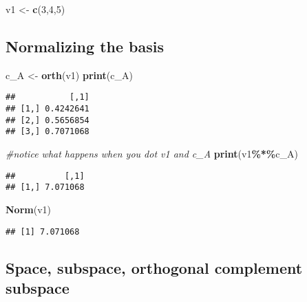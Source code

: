 \documentclass[
]{article}
\newenvironment{Shaded}{\begin{snugshade}}{\end{snugshade}}
\newcommand{\CommentTok}[1]{\textcolor[rgb]{0.56,0.35,0.01}{\textit{#1}}}
\newcommand{\DecValTok}[1]{\textcolor[rgb]{0.00,0.00,0.81}{#1}}
\newcommand{\FunctionTok}[1]{\textcolor[rgb]{0.13,0.29,0.53}{\textbf{#1}}}
\newcommand{\NormalTok}[1]{#1}
\newcommand{\OtherTok}[1]{\textcolor[rgb]{0.56,0.35,0.01}{#1}}
\newcommand{\SpecialCharTok}[1]{\textcolor[rgb]{0.81,0.36,0.00}{\textbf{#1}}}
\begin{document}
\begin{Shaded}
\begin{Highlighting}[]
\NormalTok{v1 }\OtherTok{\textless{}{-}} \FunctionTok{c}\NormalTok{(}\DecValTok{3}\NormalTok{,}\DecValTok{4}\NormalTok{,}\DecValTok{5}\NormalTok{)}
\end{Highlighting}
\end{Shaded}

\hypertarget{normalizing-the-basis}{%
\subsection{Normalizing the basis}\label{normalizing-the-basis}}

\begin{Shaded}
\begin{Highlighting}[]
\NormalTok{c\_A }\OtherTok{\textless{}{-}} \FunctionTok{orth}\NormalTok{(v1)}
\FunctionTok{print}\NormalTok{(c\_A)}
\end{Highlighting}
\end{Shaded}

\begin{verbatim}
##           [,1]
## [1,] 0.4242641
## [2,] 0.5656854
## [3,] 0.7071068
\end{verbatim}

\begin{Shaded}
\begin{Highlighting}[]
\CommentTok{\#notice what happens when you dot v1 and c\_A}
\FunctionTok{print}\NormalTok{(v1}\SpecialCharTok{\%*\%}\NormalTok{c\_A)}
\end{Highlighting}
\end{Shaded}

\begin{verbatim}
##          [,1]
## [1,] 7.071068
\end{verbatim}

\begin{Shaded}
\begin{Highlighting}[]
\FunctionTok{Norm}\NormalTok{(v1)}
\end{Highlighting}
\end{Shaded}

\begin{verbatim}
## [1] 7.071068
\end{verbatim}

\hypertarget{space-subspace-orthogonal-complement-subspace}{%
\subsection{Space, subspace, orthogonal complement
subspace}\label{space-subspace-orthogonal-complement-subspace}}
\end{document}
